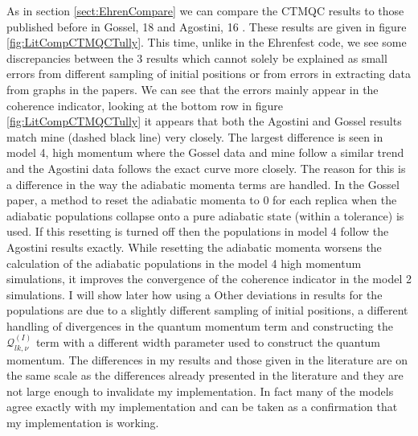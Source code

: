 As in section \ref{sect:EhrenCompare} we can compare the CTMQC results to those published before in Gossel, 18 \cite{gossel_coupled-trajectory_2018} and Agostini, 16 \cite{agostini_quantum-classical_2016}. These results are given in figure \ref{fig:LitCompCTMQCTully}. This time, unlike in the Ehrenfest code, we see some discrepancies between the 3 results which cannot solely be explained as small errors from different sampling of initial positions or from errors in extracting data from graphs in the papers. We can see that the errors mainly appear in the coherence indicator, looking at the bottom row in figure \ref{fig:LitCompCTMQCTully} it appears that both the Agostini and Gossel results match mine (dashed black line) very closely. The largest difference is seen in model 4, high momentum where the Gossel data and mine follow a similar trend and the Agostini data follows the exact curve more closely. The reason for this is a difference in the way the adiabatic momenta terms are handled. In the Gossel paper,  a method to reset the adiabatic momenta to 0 for each replica when the adiabatic populations collapse onto a pure adiabatic state (within a tolerance) is used. If this resetting is turned off then the populations in model 4 follow the Agostini results exactly. While resetting the adiabatic momenta worsens the calculation of the adiabatic populations in the model 4 high momentum simulations, it improves the convergence of the coherence indicator in the model 2 simulations. I will show later how using a  Other deviations in results for the populations are due to a slightly different sampling of initial positions, a different handling of divergences in the quantum momentum term and constructing the $\mathcal{Q}_{lk, \nu}^{(I)}$ term with a different width parameter used to construct the quantum momentum. The differences in my results and those given in the literature are on the same scale as the differences already presented in the literature and they are not large enough to invalidate my implementation. In fact many of the models agree exactly with my implementation and can be taken as a confirmation that my implementation is working. 

